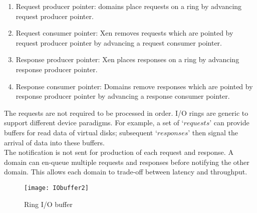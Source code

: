 \begin{enumerate}
\item Request producer pointer: domains place requests on a ring by advancing request producer pointer. 
\item Request consumer pointer: Xen removes requests which are pointed by request producer pointer by advancing a request consumer pointer. 
\item Response producer pointer: Xen places responses on a ring by advancing response producer pointer. 
\item Response consumer pointer: Domains remove responses which are pointed by response producer pointer by advancing a response consumer pointer. 
\end{enumerate} 

The requests are not required to be processed in order. I/O rings are generic to support different device paradigms. For example, a set of $‘requests’$ can provide buffers for read data of virtual disks; subsequent $‘responses’$ then signal the arrival of data into these buffers. 
\\
The notification is not sent for production of each request and response. A domain can en-queue multiple requests and responses before notifying the other domain. This allows each domain to trade-off between latency and throughput.

\begin{figure}[!ht]
\centering
\texttt{[image: IObuffer2]}
\caption{Ring I/O buffer}
\label{fig:Ring buffer}
\end{figure}
\pagebreak

